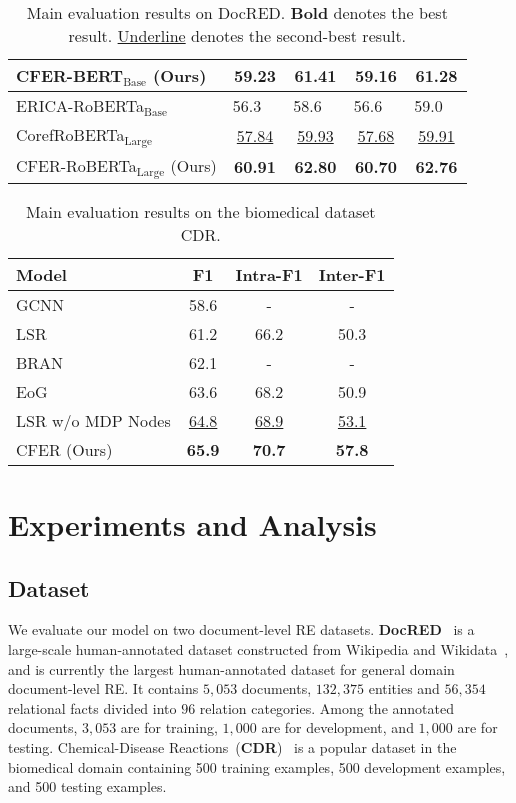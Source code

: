 \documentclass{article}
\newcommand{\citep}{\cite}
\begin{document}
\begin{table*}[t]
\begin{tabular}{l | c c | c c}
CFER-BERT$_{\text{Base}}$ (Ours) & \textbf{59.23} & \textbf{61.41} & \textbf{59.16} & \textbf{61.28} \\
\midrule
ERICA-RoBERTa$_{\text{Base}}$~\citep{erica} & 56.3~~ & 58.6~~ & 56.6~~ & 59.0~~ \\
CorefRoBERTa$_{\text{Large}}$~\citep{coref_bert} & \underline{57.84} & \underline{59.93} & \underline{57.68} & \underline{59.91} \\
CFER-RoBERTa$_{\text{Large}}$ (Ours) & \textbf{60.91} & \textbf{62.80} & \textbf{60.70} & \textbf{62.76} \\
\bottomrule
\end{tabular}
\caption{Main evaluation results on DocRED. \textbf{Bold} denotes the best result. \underline{Underline} denotes the second-best result. }
\label{tab:docred_rlt}
\end{table*}

\begin{table}[t]
\centering
\setlength{\tabcolsep}{2pt}
\begin{tabular}{l | c c c}
\toprule
\textbf{Model} & \textbf{F1} & \textbf{Intra-F1} & \textbf{Inter-F1} \\
\midrule
GCNN~\citep{gcnn} & 58.6 & - & - \\
LSR~\citep{lsr} & 61.2 & 66.2 & 50.3 \\
BRAN~\citep{barn} & 62.1 & - & - \\
EoG~\citep{eog} & 63.6 & 68.2 & 50.9 \\
LSR w/o MDP Nodes & \underline{64.8} & \underline{68.9} & \underline{53.1} \\
CFER (Ours) & \textbf{65.9} & \textbf{70.7} & \textbf{57.8} \\
\bottomrule
\end{tabular}
\caption{Main evaluation results on the biomedical dataset CDR. }
\label{tab:cdr}
\end{table}

\section{Experiments and Analysis}

\subsection{Dataset}
We evaluate our model on two document-level RE datasets. 
\textbf{DocRED}~\citep{docred} is a large-scale human-annotated dataset constructed from Wikipedia and Wikidata~\citep{wikidata}, and is currently the largest human-annotated dataset for general domain document-level RE. 
It contains $5,053$ documents, $132,375$ entities and $56,354$ relational facts divided into $96$ relation categories. 
Among the annotated documents, $3,053$ are for training, $1,000$ are for development, and $1,000$ are for testing. 
Chemical-Disease Reactions~(\textbf{CDR})~\citep{cdr} is a popular dataset in the biomedical domain containing 500 training examples, 500
development examples, and 500 testing examples. 
\end{document}

